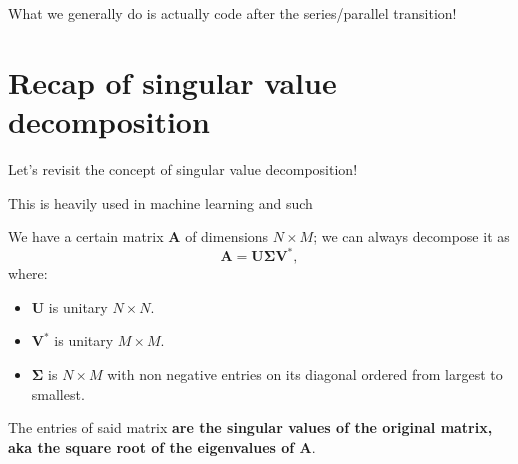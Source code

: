 \documentclass[a4paper, 12pt]{book}
\begin{document}
What we generally do is actually code after the series/parallel transition!

\begin{center}
\end{center}

\section{Recap of singular value decomposition}

Let's revisit the concept of singular value decomposition!

\noindent\colorbox{teal!10}{
    \begin{minipage}{\dimexpr\linewidth-2\fboxsep}
        This is heavily used in machine learning and such
    \end{minipage}
}

We have a certain matrix $\mathbf{A}$ of dimensions $N \times M$; we can always decompose it as
\[ \mathbf{A} = \mathbf{U} \mathbf{\Sigma} \mathbf{V}^*, \]
where:
\begin{itemize}
    \item $\mathbf{U}$ is unitary $N \times N$.
    \item $\mathbf{V}^*$ is unitary $M \times M$.
    \item $\mathbf{\Sigma}$ is $N \times M$ with non negative entries on its diagonal ordered from largest to smallest.
\end{itemize}
The entries of said matrix \textbf{are the singular values of the original matrix, aka the square root of the eigenvalues of $\mathbf{A}$}.
\end{document}
